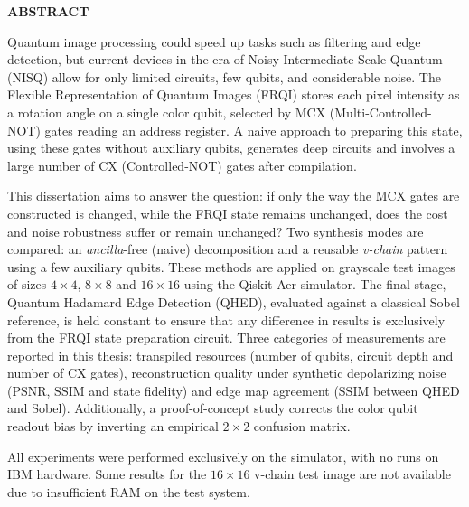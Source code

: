 \thispagestyle{abstractpagestyle}

\vspace*{36pt}

\begin{center}
    \textbf{\fontsize{20pt}{24pt} \selectfont ABSTRACT}
\end{center}

\vspace{24pt}

Quantum image processing could speed up tasks such as filtering and edge detection, but current devices in the era of Noisy Intermediate-Scale Quantum (NISQ) allow for only limited circuits, few qubits, and considerable noise. The Flexible Representation of Quantum Images (FRQI) stores each pixel intensity as a rotation angle on a single color qubit, selected by MCX (Multi-Controlled-NOT) gates reading an address register. A naive approach to preparing this state, using these gates without auxiliary qubits, generates deep circuits and involves a large number of CX (Controlled-NOT) gates after compilation.

This dissertation aims to answer the question: if only the way the MCX gates are constructed is changed, while the FRQI state remains unchanged, does the cost and noise robustness suffer or remain unchanged? Two synthesis modes are compared: an \emph{ancilla}-free (naive) decomposition and a reusable \emph{v-chain} pattern using a few auxiliary qubits. These methods are applied on grayscale test images of sizes $4\times 4$, $8\times 8$ and $16\times 16$ using the Qiskit Aer simulator. The final stage, Quantum Hadamard Edge Detection (QHED), evaluated against a classical Sobel reference, is held constant to ensure that any difference in results is exclusively from the FRQI state preparation circuit. Three categories of measurements are reported in this thesis: transpiled resources (number of qubits, circuit depth and number of CX gates), reconstruction quality under synthetic depolarizing noise (PSNR, SSIM and state fidelity) and edge map agreement (SSIM between QHED and Sobel). Additionally, a proof-of-concept study corrects the color qubit readout bias by inverting an empirical $2\times 2$ confusion matrix.

All experiments were performed exclusively on the simulator, with no runs on IBM hardware. Some results for the $16\times 16$ v-chain test image are not available due to insufficient RAM on the test system.

\vfill
